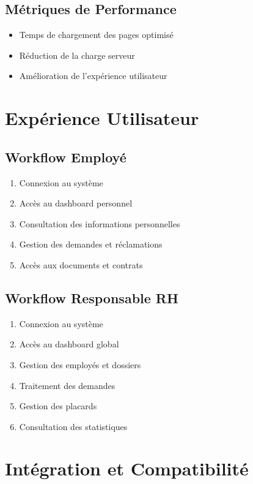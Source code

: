 \documentclass[12pt,a4paper]{article}
\begin{document}
\subsection{Métriques de Performance}
\begin{itemize}
    \item Temps de chargement des pages optimisé
    \item Réduction de la charge serveur
    \item Amélioration de l'expérience utilisateur
\end{itemize}

\section{Expérience Utilisateur}

\subsection{Workflow Employé}
\begin{enumerate}
    \item Connexion au système
    \item Accès au dashboard personnel
    \item Consultation des informations personnelles
    \item Gestion des demandes et réclamations
    \item Accès aux documents et contrats
\end{enumerate}

\subsection{Workflow Responsable RH}
\begin{enumerate}
    \item Connexion au système
    \item Accès au dashboard global
    \item Gestion des employés et dossiers
    \item Traitement des demandes
    \item Gestion des placards
    \item Consultation des statistiques
\end{enumerate}

\section{Intégration et Compatibilité}
\end{document}
